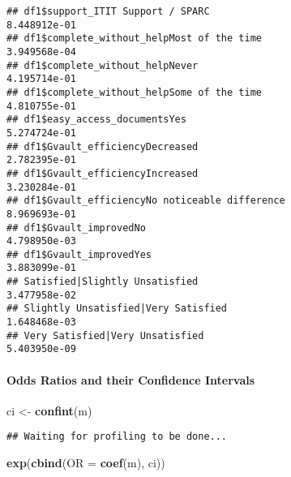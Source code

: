 \documentclass[
]{article}
\newenvironment{Shaded}{\begin{snugshade}}{\end{snugshade}}
\newcommand{\DataTypeTok}[1]{\textcolor[rgb]{0.13,0.29,0.53}{#1}}
\newcommand{\KeywordTok}[1]{\textcolor[rgb]{0.13,0.29,0.53}{\textbf{#1}}}
\newcommand{\NormalTok}[1]{#1}
\newcommand{\StringTok}[1]{\textcolor[rgb]{0.31,0.60,0.02}{#1}}
\begin{document}
\begin{verbatim}
## df1$support_ITIT Support / SPARC                                                             8.448912e-01
## df1$complete_without_helpMost of the time                                                    3.949568e-04
## df1$complete_without_helpNever                                                               4.195714e-01
## df1$complete_without_helpSome of the time                                                    4.810755e-01
## df1$easy_access_documentsYes                                                                 5.274724e-01
## df1$Gvault_efficiencyDecreased                                                               2.782395e-01
## df1$Gvault_efficiencyIncreased                                                               3.230284e-01
## df1$Gvault_efficiencyNo noticeable difference                                                8.969693e-01
## df1$Gvault_improvedNo                                                                        4.798950e-03
## df1$Gvault_improvedYes                                                                       3.883099e-01
## Satisfied|Slightly Unsatisfied                                                               3.477958e-02
## Slightly Unsatisfied|Very Satisfied                                                          1.648468e-03
## Very Satisfied|Very Unsatisfied                                                              5.403950e-09
\end{verbatim}

\hypertarget{odds-ratios-and-their-confidence-intervals}{%
\paragraph{Odds Ratios and their Confidence
Intervals}\label{odds-ratios-and-their-confidence-intervals}}

\begin{Shaded}
\begin{Highlighting}[]
\NormalTok{ci <-}\StringTok{ }\KeywordTok{confint}\NormalTok{(m)}
\end{Highlighting}
\end{Shaded}

\begin{verbatim}
## Waiting for profiling to be done...
\end{verbatim}

\begin{Shaded}
\begin{Highlighting}[]
\KeywordTok{exp}\NormalTok{(}\KeywordTok{cbind}\NormalTok{(}\DataTypeTok{OR =} \KeywordTok{coef}\NormalTok{(m), ci))}
\end{Highlighting}
\end{Shaded}
\end{document}
